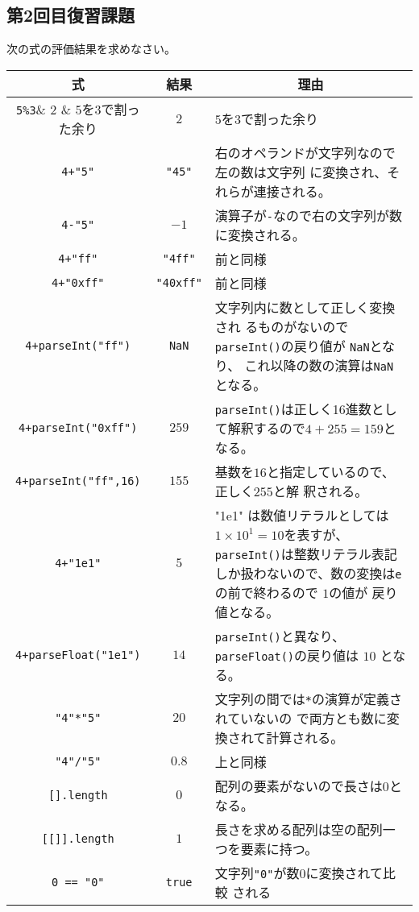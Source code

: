 \documentclass[a4j]{jarticle}
\begin{document}
\subsection{第2回目復習課題}
\newcommand{\Rule}{\iffalse\rule[-2ex]{0em}{5ex}\fi}
次の式の評価結果を求めなさい。
\begin{center}
 \begin{tabular}{|>{\Rule}c|c|m{}|}\hline
  \multicolumn{1}{|c|}{式}&\multicolumn{1}{c|}{結果} &\multicolumn{1}{c|}{理由} \\\hline
  \verb+5%3+& 2 & $5$を$3$で割った余り\\ \hline
  \verb-4+"5"-& \verb+"45"+& 右のオペランドが文字列なので左の数は文字列
	  に変換され、それらが連接される。\\ \hline
  \verb+4-"5"+& $-1$& 演算子が\verb+-+なので右の文字列が数に変換される。\\ \hline
  \verb-4+"ff"-&\verb+"4ff"+ & 前と同様\\ \hline
  \verb-4+"0xff"-& \verb+"40xff"+& 前と同様\\ \hline
  \verb-4+parseInt("ff")-& \verb+NaN+& 文字列内に数として正しく変換され
	  るものがないので\verb+parseInt()+の戻り値が \verb-NaN-となり、
	  これ以降の数の演算は\verb+NaN+となる。\\ \hline
  \verb-4+parseInt("0xff")-& $259$& \verb+parseInt()+は正しく16進数とし
	  て解釈するので$4+255=159$となる。\\ \hline
  \verb-4+parseInt("ff",16)-& $155$& 基数を$16$と指定しているので、正しく$255$と解
	  釈される。\\ \hline
  \verb-4+"1e1"-& $5$ & "1e1" は数値リテラルとしては
	  $1\times10^1=10$を表すが、\verb+parseInt()+は整数リテラル表記
	  しか扱わないので、数の変換は\verb+e+の前で終わるので $1$の値が
	  戻り値となる。 \\ \hline
  \verb-4+parseFloat("1e1")-& $14$& \verb+parseInt()+と異なり、
	  \verb+parseFloat()+の戻り値は $10$ となる。\\ \hline
  \verb+"4"*"5"+& $20$& 文字列の間では\verb+*+の演算が定義されていないの
	  で両方とも数に変換されて計算される。\\ \hline
  \verb+"4"/"5"+& $0.8$& 上と同様\\ \hline
  \verb+[].length+& $0$& 配列の要素がないので長さは$0$となる。\\ \hline
  \verb+[[]].length+&$1$ & 長さを求める配列は空の配列一つを要素に持つ。\\ \hline
  \verb+0 == "0"+& \verb+true+& 文字列\verb+"0"+が数$0$に変換されて比較
	  される\\ \hline

\end{tabular}
\end{center}
\end{document}
